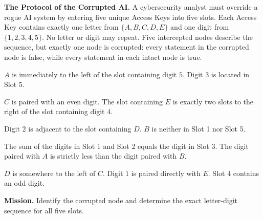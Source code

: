 \label{text_cases}

\begin{caseprompt}
\textbf{The Protocol of the Corrupted AI.}
A cybersecurity analyst must override a rogue AI system by entering five unique Access Keys into five slots. Each Access Key contains exactly one letter from \(\{A,B,C,D,E\}\) and one digit from \(\{1,2,3,4,5\}\). No letter or digit may repeat. Five intercepted nodes describe the sequence, but exactly one node is corrupted: every statement in the corrupted node is false, while every statement in each intact node is true.

\begin{description}[leftmargin=1.8em,itemsep=0.2em,topsep=0.3em]
  \item[Node 1.] \(A\) is immediately to the left of the slot containing digit \(5\). Digit \(3\) is located in Slot 5.
  \item[Node 2.] \(C\) is paired with an even digit. The slot containing \(E\) is exactly two slots to the right of the slot containing digit \(4\).
  \item[Node 3.] Digit \(2\) is adjacent to the slot containing \(D\). \(B\) is neither in Slot 1 nor Slot 5.
  \item[Node 4.] The sum of the digits in Slot 1 and Slot 2 equals the digit in Slot 3. The digit paired with \(A\) is strictly less than the digit paired with \(B\).
  \item[Node 5.] \(D\) is somewhere to the left of \(C\). Digit \(1\) is paired directly with \(E\). Slot 4 contains an odd digit.
\end{description}

\textbf{Mission.} Identify the corrupted node and determine the exact letter-digit sequence for all five slots.
\end{caseprompt}

